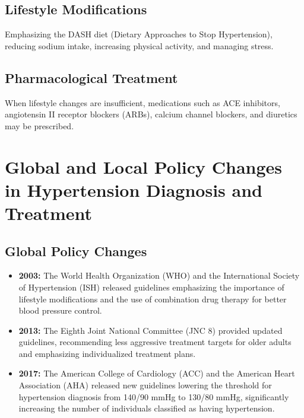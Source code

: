 \documentclass{article}
\begin{document}
\subsection{Lifestyle Modifications}
Emphasizing the DASH diet (Dietary Approaches to Stop Hypertension), reducing sodium intake, increasing physical activity, and managing stress.

\subsection{Pharmacological Treatment}
When lifestyle changes are insufficient, medications such as ACE inhibitors, angiotensin II receptor blockers (ARBs), calcium channel blockers, and diuretics may be prescribed.

\section{Global and Local Policy Changes in Hypertension Diagnosis and Treatment}

\subsection{Global Policy Changes}
\begin{itemize}
    \item \textbf{2003:} The World Health Organization (WHO) and the International Society of Hypertension (ISH) released guidelines emphasizing the importance of lifestyle modifications and the use of combination drug therapy for better blood pressure control.
    \item \textbf{2013:} The Eighth Joint National Committee (JNC 8) provided updated guidelines, recommending less aggressive treatment targets for older adults and emphasizing individualized treatment plans.
    \item \textbf{2017:} The American College of Cardiology (ACC) and the American Heart Association (AHA) released new guidelines lowering the threshold for hypertension diagnosis from 140/90 mmHg to 130/80 mmHg, significantly increasing the number of individuals classified as having hypertension.
\end{itemize}
\end{document}
